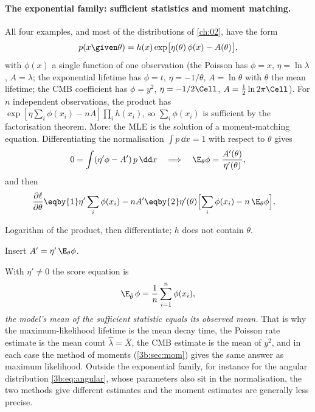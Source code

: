 \paragraph{The exponential family: sufficient statistics and moment matching.}
All four examples, and most of the distributions of \cref{ch:02},
have the form
\begin{equation}
  p(x\given\theta)=h(x)\exp\bigl[\eta(\theta)\,\phi(x)-A(\theta)\bigr],
  \label{3b:eq:expfam}
\end{equation}
with $\phi(x)$ a single function of one observation (the Poisson has
$\phi=x$, $\eta=\ln\lambda$, $A=\lambda$; the exponential lifetime has
$\phi=t$, $\eta=-1/\theta$, $A=\ln\theta$ with $\theta$ the mean lifetime; the CMB coefficient has
$\phi=y^2$, $\eta=-1/2\Cell$, $A=\tfrac12\ln2\pi\Cell$). For $n$
independent observations, the product has
$\exp[\eta\sum_i\phi(x_i)-nA]\prod_ih(x_i)$, so $\sum_i\phi(x_i)$ is
sufficient by the factorisation theorem. More: the MLE is the solution of
a moment-matching equation. Differentiating the normalisation
$\int p\,\dd x=1$ with respect to $\theta$ gives
\[
  0=\int(\eta'\phi-A')\,p\,\dd x
  \quad\Longrightarrow\quad
  \E_\theta\phi=\frac{A'(\theta)}{\eta'(\theta)},
\]
and then
\begin{align}
  \frac{\partial\ell}{\partial\theta}
  &\eqby{1}\eta'\sum_i\phi(x_i)-nA'
   \eqby{2}\eta'(\theta)\Bigl[\sum_i\phi(x_i)-n\,\E_\theta\phi\Bigr] .
  \label{3b:eq:expfam-score}
\end{align}
\begin{explain}
  \item Logarithm of the product, then differentiate; $h$ does not contain $\theta$.
  \item Insert $A'=\eta'\,\E_\theta\phi$.
\end{explain}
With $\eta'\ne0$ the score equation is
\begin{equation}
  \E_{\hat\theta}\,\phi=\frac1n\sum_{i=1}^n\phi(x_i),
  \label{3b:eq:moment-match}
\end{equation}
\emph{the model's mean of the sufficient statistic equals its observed
mean.} That is why the maximum-likelihood lifetime is the mean decay time,
the Poisson rate estimate is the mean count $\hat\lambda=\bar X$, the CMB
estimate is the mean of $y^2$, and in each case the method of moments
(\cref{3b:sec:mom}) gives the same answer as maximum likelihood. Outside the
exponential family, for instance for the angular distribution
\eqref{3b:eq:angular}, whose parameters also sit in the normalisation, the two
methods give different estimates and the moment estimates are generally less precise.

